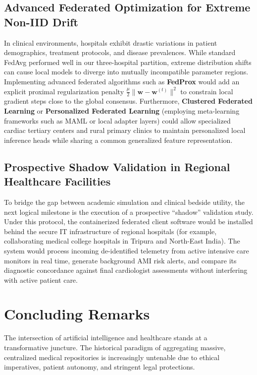 \documentclass[12pt,a4paper,oneside]{report}
\begin{document}
\subsection{Advanced Federated Optimization for Extreme Non-IID Drift}
In clinical environments, hospitals exhibit drastic variations in patient demographics, treatment protocols, and disease prevalences. While standard FedAvg performed well in our three-hospital partition, extreme distribution shifts can cause local models to diverge into mutually incompatible parameter regions. Implementing advanced federated algorithms such as \textbf{FedProx} \citep{li2020federated} would add an explicit proximal regularization penalty $\frac{\mu}{2} \|\mathbf{w} - \mathbf{w}^{(t)}\|^2$ to constrain local gradient steps close to the global consensus. Furthermore, \textbf{Clustered Federated Learning} or \textbf{Personalized Federated Learning} (employing meta-learning frameworks such as MAML or local adapter layers) could allow specialized cardiac tertiary centers and rural primary clinics to maintain personalized local inference heads while sharing a common generalized feature representation.

\subsection{Prospective Shadow Validation in Regional Healthcare Facilities}
To bridge the gap between academic simulation and clinical bedside utility, the next logical milestone is the execution of a prospective ``shadow'' validation study. Under this protocol, the containerized federated client software would be installed behind the secure IT infrastructure of regional hospitals (for example, collaborating medical college hospitals in Tripura and North-East India). The system would process incoming de-identified telemetry from active intensive care monitors in real time, generate background AMI risk alerts, and compare its diagnostic concordance against final cardiologist assessments without interfering with active patient care.

\section{Concluding Remarks}
\label{sec:final_remarks}

The intersection of artificial intelligence and healthcare stands at a transformative juncture. The historical paradigm of aggregating massive, centralized medical repositories is increasingly untenable due to ethical imperatives, patient autonomy, and stringent legal protections. 
\end{document}
